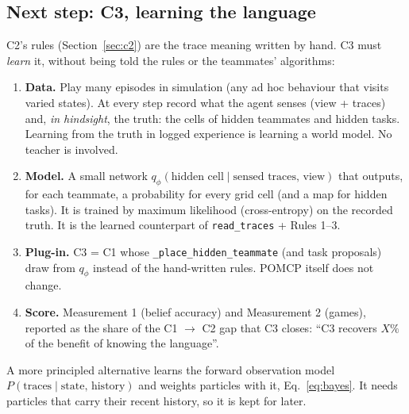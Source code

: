 \documentclass[11pt,a4paper]{article}
\newcommand{\code}[1]{\texttt{#1}}
\theoremstyle{remark}
\begin{document}
\subsection{Next step: C3, learning the language}

C2's rules (Section~\ref{sec:c2}) are the trace meaning written by hand. C3 must \emph{learn} it, without being told the
rules or the teammates' algorithms:
\begin{enumerate}[leftmargin=*]
  \item \textbf{Data.} Play many episodes in simulation (any ad hoc behaviour that visits varied states). At every step
        record what the agent senses (view + traces) and, \emph{in hindsight}, the truth: the cells of hidden teammates and
        hidden tasks. Learning from the truth in logged experience is learning a world model. No teacher is involved.
  \item \textbf{Model.} A small network $q_\phi(\text{hidden cell} \mid \text{sensed traces, view})$ that outputs, for each
        teammate, a probability for every grid cell (and a map for hidden tasks). It is trained by maximum likelihood
        (cross-entropy) on the recorded truth. It is the learned counterpart of \code{read\_traces} + Rules 1--3.
  \item \textbf{Plug-in.} C3 = C1 whose \code{\_place\_hidden\_teammate} (and task proposals) draw from $q_\phi$ instead of
        the hand-written rules. POMCP itself does not change.
  \item \textbf{Score.} Measurement 1 (belief accuracy) and Measurement 2 (games), reported as the share of the
        C1 $\to$ C2 gap that C3 closes: ``C3 recovers $X\%$ of the benefit of knowing the language''.
\end{enumerate}
A more principled alternative learns the forward observation model $P(\text{traces}\mid\text{state, history})$ and
weights particles with it, Eq.~\eqref{eq:bayes}. It needs particles that carry their recent history, so it is kept for
later.
\end{document}
